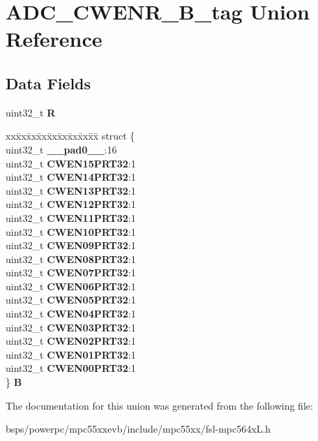 \hypertarget{unionADC__CWENR__32B__tag}{}\section{A\+D\+C\+\_\+\+C\+W\+E\+N\+R\+\_\+B\+\_\+tag Union Reference}
\label{unionADC__CWENR__32B__tag}
\subsection*{Data Fields}
\begin{DoxyCompactItemize}
\item 
\mbox{\label{unionADC__CWENR__32B__tag_ad9e4d1009c794d8417630e809e36bab6}} 
uint32\+\_\+t {\bfseries R}
\item 
\mbox{\label{unionADC__CWENR__32B__tag_a8674d0368bb76b65b09712bf30ba2498}} 
\begin{tabbing}
xx\=xx\=xx\=xx\=xx\=xx\=xx\=xx\=xx\=\kill
struct \{\\
\>uint32\_t {\bfseries \_\_pad0\_\_}:16\\
\>uint32\_t {\bfseries CWEN15PRT32}:1\\
\>uint32\_t {\bfseries CWEN14PRT32}:1\\
\>uint32\_t {\bfseries CWEN13PRT32}:1\\
\>uint32\_t {\bfseries CWEN12PRT32}:1\\
\>uint32\_t {\bfseries CWEN11PRT32}:1\\
\>uint32\_t {\bfseries CWEN10PRT32}:1\\
\>uint32\_t {\bfseries CWEN09PRT32}:1\\
\>uint32\_t {\bfseries CWEN08PRT32}:1\\
\>uint32\_t {\bfseries CWEN07PRT32}:1\\
\>uint32\_t {\bfseries CWEN06PRT32}:1\\
\>uint32\_t {\bfseries CWEN05PRT32}:1\\
\>uint32\_t {\bfseries CWEN04PRT32}:1\\
\>uint32\_t {\bfseries CWEN03PRT32}:1\\
\>uint32\_t {\bfseries CWEN02PRT32}:1\\
\>uint32\_t {\bfseries CWEN01PRT32}:1\\
\>uint32\_t {\bfseries CWEN00PRT32}:1\\
\} {\bfseries B}\\

\end{tabbing}\end{DoxyCompactItemize}


The documentation for this union was generated from the following file\+:\begin{DoxyCompactItemize}
\item 
bsps/powerpc/mpc55xxevb/include/mpc55xx/fsl-\/mpc564x\+L.\+h\end{DoxyCompactItemize}
